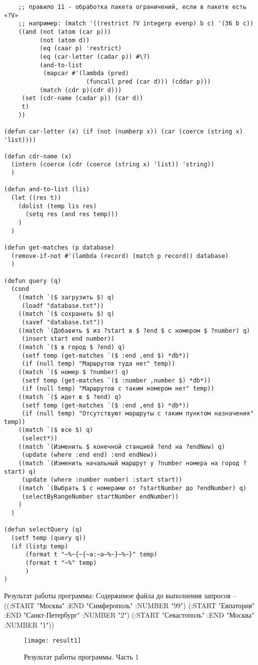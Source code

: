 \documentclass[a4paper,14pt]{extarticle}
\begin{document}
\begin{lstlisting}
    ;; правило 11 - обработка пакета ограничений, если в пакете есть «?V»
    ;; например: (match '((restrict ?V integerp evenp) b c) '(36 b c))
    ((and (not (atom (car p)))
          (not (atom d))
          (eq (caar p) 'restrict)
          (eq (car-letter (cadar p)) #\?)
          (and-to-list
           (mapcar #'(lambda (pred)
                       (funcall pred (car d))) (cddar p)))
          (match (cdr p)(cdr d)))
     (set (cdr-name (cadar p)) (car d))
     t)
    ))

(defun car-letter (x) (if (not (numberp x)) (car (coerce (string x) 'list))))

(defun cdr-name (x)
  (intern (coerce (cdr (coerce (string x) 'list)) 'string))
  )

(defun and-to-list (lis)
  (let ((res t))
    (dolist (temp lis res)
      (setq res (and res temp)))
    )
  )

(defun get-matches (p database)
  (remove-if-not #'(lambda (record) (match p record)) database)
  )

(defun query (q)
  (cond 
    ((match `($ загрузить $) q)
     (loadf "database.txt"))
    ((match `($ сохранить $) q)
     (savef "database.txt"))
    ((match `(Добавить $ из ?start в $ ?end $ с номером $ ?number) q)   
     (insert start end number))
    ((match `($ в город $ ?end) q)
     (setf temp (get-matches `($ :end ,end $) *db*))
     (if (null temp) "Маршрутов туда нет" temp))
    ((match `($ номер $ ?number) q)
     (setf temp (get-matches `($ :number ,number $) *db*))
     (if (null temp) "Маршрутов с таким номером нет" temp))
    ((match `($ идет в $ ?end) q)
     (setf temp (get-matches `($ :end ,end $) *db*))
     (if (null temp) "Отсутствуют маршруты с таким пунктом назначения" temp))
    ((match `($ все $) q)
     (select*))
    ((match `(Изменить $ конечной станцией ?end на ?endNew) q)
     (update (where :end end) :end endNew))
    ((match `(Изменить начальный маршрут у ?number номера на город ?start) q)
     (update (where :number number) :start start))
    ((match `(Выбрать $ с номерами от ?startNumber до ?endNumber) q)
     (selectByRangeNumber startNumber endNumber))
    )
  )

(defun selectQuery (q) 
  (setf temp (query q)) 
  (if (listp temp) 
      (format t "~%~{~{~a:~a~%~}~%~}" temp) 
      (format t "~%" temp)
      )
)
\end{lstlisting}

Результат работы программы: Содержимое файла до выполнения запросов – ((:START
"Москва" :END "Симферополь" :NUMBER "99") (:START "Евпатория" :END
"Санкт-Петербург" :NUMBER "2") (:START "Севастополь" :END "Москва" :NUMBER "1"))
\begin{figure}[H]
    \centering
    \texttt{[image: result1]}
    \caption{Результат работы программы. Часть 1}
    \label{fig:result1}
\end{figure}
\end{document}
